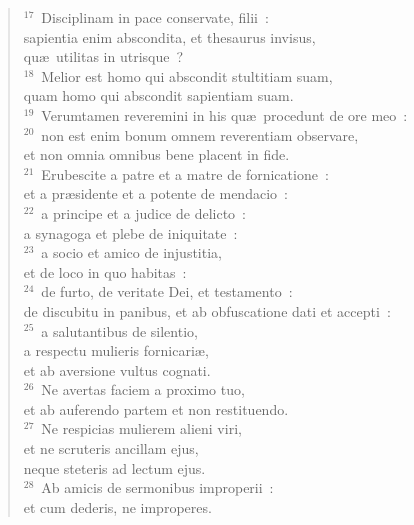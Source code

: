 \begin{verse}${}^{17}$~Disciplinam in pace conservate, filii~:\\ sapientia enim abscondita, et thesaurus invisus,\\ qu\ae\ utilitas in utrisque~?\\
${}^{18}$~Melior est homo qui abscondit stultitiam suam,\\ quam homo qui abscondit sapientiam suam.\\
${}^{19}$~Verumtamen reveremini in his qu\ae\ procedunt de ore meo~:\\
${}^{20}$~non est enim bonum omnem reverentiam observare,\\ et non omnia omnibus bene placent in fide.\\
${}^{21}$~Erubescite a patre et a matre de fornicatione~:\\ et a pr\ae sidente et a potente de mendacio~:\\
${}^{22}$~a principe et a judice de delicto~:\\ a synagoga et plebe de iniquitate~:\\
${}^{23}$~a socio et amico de injustitia,\\ et de loco in quo habitas~:\\
${}^{24}$~de furto, de veritate Dei, et testamento~:\\ de discubitu in panibus, et ab obfuscatione dati et accepti~:\\
${}^{25}$~a salutantibus de silentio,\\ a respectu mulieris fornicari\ae ,\\ et ab aversione vultus cognati.\\
${}^{26}$~Ne avertas faciem a proximo tuo,\\ et ab auferendo partem et non restituendo.\\
${}^{27}$~Ne respicias mulierem alieni viri,\\ et ne scruteris ancillam ejus,\\ neque steteris ad lectum ejus.\\
${}^{28}$~Ab amicis de sermonibus improperii~:\\ et cum dederis, ne improperes.\end{verse}



